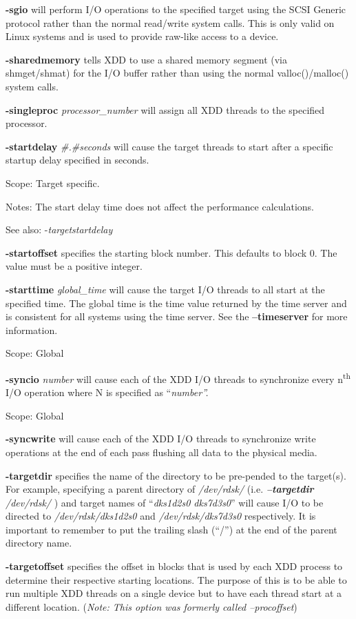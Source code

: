 \textbf{-sgio} will perform I/O operations to the specified target using the SCSI Generic protocol rather than the normal read/write system calls. This is only valid on Linux systems and is used to provide raw-like access to a device.

\textbf{-sharedmemory} tells XDD to use a shared memory segment (via shmget/shmat) for the I/O buffer rather than using the normal valloc()/malloc() system calls.

\textbf{-singleproc} \emph{processor\_number} will assign all XDD threads to the specified processor.

\textbf{-startdelay} \emph{\#.\#seconds} will cause the target threads to start after a specific startup delay specified in seconds.

Scope: Target specific.

Notes: The start delay time does not affect the performance calculations.

See also: -\emph{targetstartdelay}

\textbf{-startoffset} specifies the starting block number. This defaults to block 0. The value must be a positive integer.

\textbf{-starttime} \emph{global\_time} will cause the target I/O threads to all start at the specified time. The global time is the time value returned by the time server and is consistent for all systems using the time server. See the \textbf{--timeserver} for more information.

Scope: Global

\textbf{-syncio} \emph{number} will cause each of the XDD I/O threads to synchronize every n\textsuperscript{th} I/O operation where N is specified as ``\emph{number''.}

Scope: Global

\textbf{-syncwrite} will cause each of the XDD I/O threads to synchronize write operations at the end of each pass flushing all data to the physical media.

\textbf{-targetdir} specifies the name of the directory to be pre-pended to the target(s). For example, specifying a parent directory of \emph{/dev/rdsk/} (i.e. \emph{\textbf{--targetdir} /dev/rdsk/} ) and target names of ``\emph{dks1d2s0 dks7d3s0}'' will cause I/O to be directed to \emph{/dev/rdsk/dks1d2s0} and \emph{/dev/rdsk/dks7d3s0} respectively. It is important to remember to put the trailing slash (``/'') at the end of the parent directory name.

\textbf{-targetoffset} specifies the offset in blocks that is used by each XDD process to determine their respective starting locations. The purpose of this is to be able to run multiple XDD threads on a single device but to have each thread start at a different location. (\emph{Note: This option was formerly called --procoffset})


